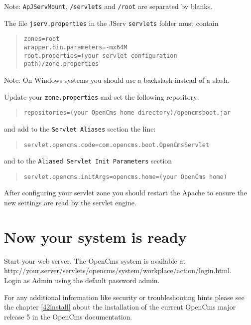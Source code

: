 Note: \texttt{ApJServMount}, \texttt{/servlets} and \texttt{/root} are separated by blanks.

The file \texttt{jserv.properties} in the JServ \texttt{servlets} folder must contain

\begin{quote}
\texttt{zones=root\\
wrapper.bin.parameters=-mx64M\\
root.properties=(your servlet configuration path)/zone.properties}
\end{quote}

Note: On Windows systems you should use a backslash instead of a slash. 

Update your \texttt{zone.properties} and set the following repository: 

\begin{quote}
\begin{verbatim}
repositories=(your OpenCms home directory)/opencmsboot.jar
\end{verbatim}
\end{quote}

and add to the \texttt{Servlet Aliases} section the line: 

\begin{quote}
\texttt{servlet.opencms.code=com.opencms.boot.OpenCmsServlet} 
\end{quote}

and to the \texttt{Aliased Servlet Init Parameters} section 

\begin{quote}
\texttt{servlet.opencms.initArgs=opencms.home=(your OpenCms home) }
\end{quote}

After configuring your servlet zone you should restart the Apache to
ensure the new settings are read by the servlet engine.

\section{Now your system is ready}

Start your web server. The OpenCms system is available at\\
http://your.server/servlets/opencms/system/workplace/action/login.html.\\
Login as Admin using the default password admin. 

For any additional information like security or troubleshooting hints
please see the chapter \ref{42install} about the installation of the current OpenCms
major release 5 in the OpenCms documentation.
